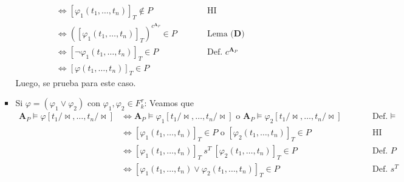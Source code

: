 \documentclass{article}
\begin{document}
\begin{enumerate}
\begin{itemize}
\begin{itemize}
\begin{equation*}
\begin{alignedat}{2}
                                                                                         & \iff[\varphi_1(t_1,\dots,t_n)]_T\notin P                               &  & \qquad\text{HI}                    \\
                                                                                         & \iff([\varphi_1(t_1,\dots,t_n)]_T)^{c^{\mathbf{A}_P}}\in P             &  & \qquad\text{Lema }\textbf{(D)}     \\
                                                                                         & \iff[\neg\varphi_1(t_1,\dots,t_n)]_T\in P                              &  & \qquad\text{Def. }c^{\mathbf{A}_P} \\
                                                                                         & \iff[\varphi(t_1,\dots,t_n)]_T\in P
                          \end{alignedat}
                        \end{equation*}
                        Luego, se prueba para este caso.
                  \item Si $\varphi=(\varphi_1\lor\varphi_2)$ con $\varphi_1,\varphi_2\in F^\tau_k$: Veamos que
                        \begin{equation*}
                          \begin{alignedat}{2}
                            \mathbf{A}_P\vDash\varphi[t_1/\!\bowtie,\dots,t_n/\!\bowtie] & \iff \mathbf{A}_P\vDash\varphi_1[t_1/\!\bowtie,\dots,t_n/\!\bowtie]\text{ o } \mathbf{A}_P\vDash\varphi_2[t_1/\!\bowtie,\dots,t_n/\!\bowtie] &  & \qquad\text{Def. }\vDash \\
                                                                                         & \iff [\varphi_1(t_1,\dots,t_n)]_T\in P\text{ o }[\varphi_2(t_1,\dots,t_n)]_T\in P                                                            &  & \qquad\text{HI}          \\
                                                                                         & \iff [\varphi_1(t_1,\dots,t_n)]_T\ s^T\ [\varphi_2(t_1,\dots,t_n)]_T\in P                                                                    &  & \qquad\text{Def. }P      \\
                                                                                         & \iff [\varphi_1(t_1,\dots,t_n)\lor\varphi_2(t_1,\dots,t_n)]_T\in P                                                                           &  & \qquad\text{Def. }s^T    \\

\end{alignedat}
\end{equation*}
\end{itemize}
\end{itemize}
\end{enumerate}
\end{document}

